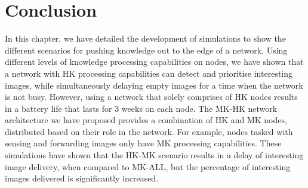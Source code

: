 


\section{Conclusion} \label{sim:conc}
	
In this chapter, we have detailed the development of simulations to show the different scenarios for pushing knowledge out to the edge of a network. Using different levels of knowledge processing capabilities on nodes, we have shown that a network with HK processing capabilities can detect and prioritise interesting images, while simultaneously delaying empty images for a time when the network is not busy. However, using a network that solely comprises of HK nodes results in a battery life that lasts for 3 weeks on each node. The MK-HK network architecture we have proposed provides a combination of HK and MK nodes, distributed based on their role in the network. For example, nodes tasked with sensing and forwarding images only have MK processing capabilities. These simulations have shown that the HK-MK scenario results in a delay of interesting image delivery, when compared to MK-ALL, but the percentage of interesting images delivered is significantly increased.

